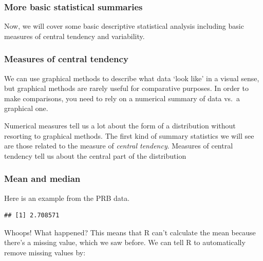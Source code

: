 \documentclass[
]{article}
\newenvironment{Shaded}{\begin{snugshade}}{\end{snugshade}}
\newcommand{\AttributeTok}[1]{\textcolor[rgb]{0.77,0.63,0.00}{#1}}
\newcommand{\ConstantTok}[1]{\textcolor[rgb]{0.00,0.00,0.00}{#1}}
\newcommand{\FunctionTok}[1]{\textcolor[rgb]{0.00,0.00,0.00}{#1}}
\newcommand{\NormalTok}[1]{#1}
\newcommand{\SpecialCharTok}[1]{\textcolor[rgb]{0.00,0.00,0.00}{#1}}
\begin{document}
\hypertarget{more-basic-statistical-summaries}{%
\subsubsection{More basic statistical summaries}\label{more-basic-statistical-summaries}}

Now, we will cover some basic descriptive statistical analysis including
basic measures of central tendency and variability.

\hypertarget{measures-of-central-tendency}{%
\subsubsection{Measures of central tendency}\label{measures-of-central-tendency}}

We can use graphical methods to describe what data `look like' in a
visual sense, but graphical methods are rarely useful for comparative
purposes. In order to make comparisons, you need to rely on a numerical
summary of data vs.~a graphical one.

Numerical measures tell us a lot about the form of a distribution
without resorting to graphical methods. The first kind of summary
statistics we will see are those related to the measure of \emph{central
tendency}. Measures of central tendency tell us about the central part
of the distribution

\hypertarget{mean-and-median}{%
\subsubsection{Mean and median}\label{mean-and-median}}

Here is an example from the PRB data.

\begin{Shaded}
\end{Shaded}

\begin{verbatim}
## [1] 2.708571
\end{verbatim}

Whoops! What happened? This means that R can't calculate the mean
because there's a missing value, which we saw before. We can tell R to
automatically remove missing values by:

\begin{Shaded}
\end{Shaded}
\end{document}
